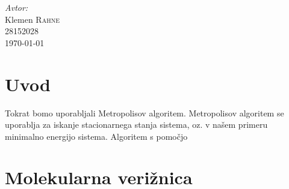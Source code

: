 \documentclass[slovene,11pt,a4paper]{article}
\numberwithin{equation}{section} %
\numberwithin{figure}{section} %
\numberwithin{table}{section} %
\begin{document}
\begin{titlepage}



\Large \emph{Avtor:}\\
Klemen \textsc{Rahne}\\
28152028\\[2cm]

{\large \today } \\[0.5cm] %

	

\end{titlepage}






\section{Uvod}

Tokrat bomo uporabljali Metropolisov algoritem. Metropolisov algoritem se uporablja za iskanje stacionarnega stanja sistema, oz. v našem primeru minimalno energijo sistema. Algoritem s pomočjo 


\section{Molekularna verižnica}
\end{document}

